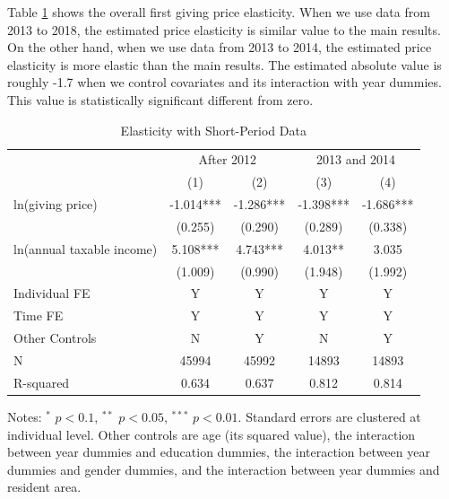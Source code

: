 \documentclass[
  11pt,
  a4paper,
]{article}
\begin{document}
  Table \ref{tab:kableShortElasticity1} shows the overall first giving price elasticity.
  When we use data from 2013 to 2018, the estimated price elasticity is similar value to the main results.
  On the other hand,
  when we use data from 2013 to 2014, the estimated price elasticity is more elastic than the main results.
  The estimated absolute value is roughly -1.7 when we control covariates and its interaction with year dummies.
  This value is statistically significant different from zero.

  \begin{table}

  \caption{\label{tab:kableShortElasticity1}Elasticity with Short-Period Data}
  \centering
  \fontsize{7}{9}\selectfont
  \begin{threeparttable}
  \begin{tabular}[t]{lcccc}
  \toprule
  \multicolumn{1}{c}{ } & \multicolumn{2}{c}{After 2012} & \multicolumn{2}{c}{2013 and 2014} \\
  \cmidrule(l{3pt}r{3pt}){2-3} \cmidrule(l{3pt}r{3pt}){4-5}
   & (1) & (2) & (3) & (4)\\
  \midrule
  ln(giving price) & -1.014*** & -1.286*** & -1.398*** & -1.686***\\
   & (0.255) & (0.290) & (0.289) & (0.338)\\
  ln(annual taxable income) & 5.108*** & 4.743*** & 4.013** & 3.035\\
   & (1.009) & (0.990) & (1.948) & (1.992)\\
  Individual FE & Y & Y & Y & Y\\
  Time FE & Y & Y & Y & Y\\
  Other Controls & N & Y & N & Y\\
  N & 45994 & 45992 & 14893 & 14893\\
  R-squared & 0.634 & 0.637 & 0.812 & 0.814\\
  \bottomrule
  \end{tabular}
  \begin{tablenotes}
  \item Notes: $^{*}$ $p < 0.1$, $^{**}$ $p < 0.05$, $^{***}$ $p < 0.01$. Standard errors are clustered at individual level. Other controls are age (its squared value), the interaction between year dummies and education dummies, the interaction between year dummies and gender dummies, and the interaction between year dummies and resident area.
  \end{tablenotes}
  \end{threeparttable}
  \end{table}
\end{document}
